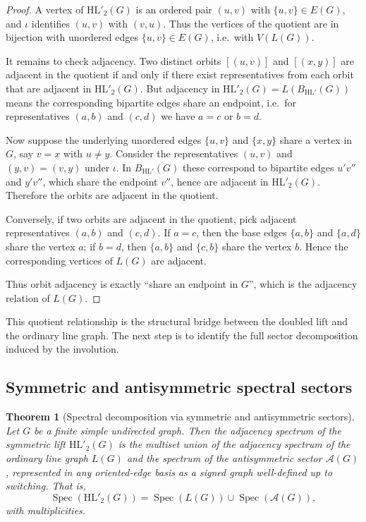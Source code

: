 \documentclass[11pt]{article}
\newtheorem{theorem}{Theorem}
\newcommand{\HL}{\mathrm{HL}}
\theoremstyle{plain}
\begin{document}
\begin{proof}
A vertex of $\HL'_2(G)$ is an ordered pair $(u,v)$ with $\{u,v\}\in E(G)$, and
$\iota$ identifies $(u,v)$ with $(v,u)$. Thus the vertices of the quotient are in
bijection with unordered edges $\{u,v\}\in E(G)$, i.e.\ with $V(L(G))$.

It remains to check adjacency. Two distinct orbits
$[\!(u,v)\!]$ and $[\!(x,y)\!]$ are adjacent in the quotient if and only if
there exist representatives from each orbit that are adjacent in $\HL'_2(G)$.
But adjacency in $\HL'_2(G)=L(B_{\HL'}(G))$ means the corresponding bipartite
edges share an endpoint, i.e.\ for representatives $(a,b)$ and $(c,d)$ we have
$a=c$ or $b=d$.

Now suppose the underlying unordered edges $\{u,v\}$ and $\{x,y\}$ share a
vertex in $G$, say $v=x$ with $u\neq y$. Consider the representatives $(u,v)$
and $(y,v)=(v,y)$ under $\iota$. In $B_{\HL'}(G)$ these correspond to bipartite
edges $u'v''$ and $y'v''$, which share the endpoint $v''$, hence are adjacent in
$\HL'_2(G)$. Therefore the orbits are adjacent in the quotient.

Conversely, if two orbits are adjacent in the quotient, pick adjacent
representatives $(a,b)$ and $(c,d)$. If $a=c$, then the base edges
$\{a,b\}$ and $\{a,d\}$ share the vertex $a$; if $b=d$, then $\{a,b\}$ and
$\{c,b\}$ share the vertex $b$. Hence the corresponding vertices of $L(G)$ are
adjacent.

Thus orbit adjacency is exactly “share an endpoint in $G$”, which is the
adjacency relation of $L(G)$.
\end{proof}

This quotient relationship is the structural bridge between the doubled lift and the ordinary line graph.
The next step is to identify the full sector decomposition induced by the involution.

\subsection{Symmetric and antisymmetric spectral sectors}

\begin{theorem}[Spectral decomposition via symmetric and antisymmetric sectors]\label{thm:spectral-decomposition}
Let \( G \) be a finite simple undirected graph. Then the adjacency spectrum of the symmetric lift
\( \mathrm{HL}'_2(G) \) is the multiset union of the adjacency spectrum of the ordinary line graph
\( L(G) \) and the spectrum of the antisymmetric sector \(\mathcal A(G)\), represented in any oriented-edge
basis as a signed graph well-defined up to switching. That is,
\[
\operatorname{Spec}(\mathrm{HL}'_2(G)) = \operatorname{Spec}(L(G)) \cup \operatorname{Spec}(\mathcal A(G)),
\]
with multiplicities.
\end{theorem}
\end{document}

